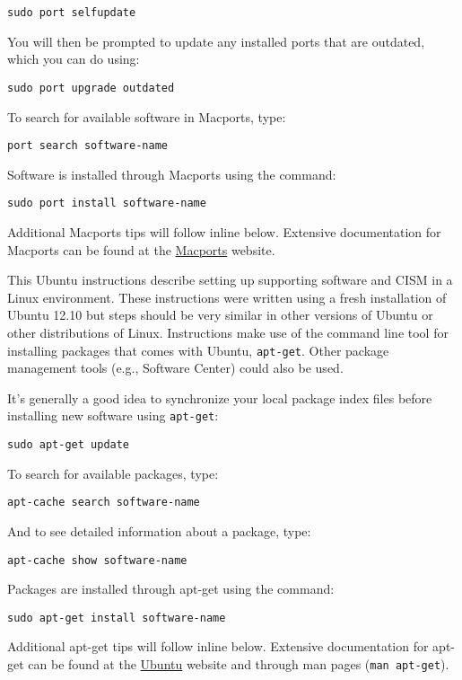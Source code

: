 \begin{mdframed}[style=mac]
\texttt{sudo port selfupdate}

You will then be prompted to update any installed ports that are outdated, which you can do using:

\texttt{sudo port upgrade outdated}

To search for available software in Macports, type: 

\texttt{port search software-name}

Software is installed through Macports using the command:

\texttt{sudo port install software-name}

Additional Macports tips will follow inline below. Extensive documentation for Macports 
can be found at the \href{http://guide.macports.org}{Macports} website.
\end{mdframed}              %


\begin{mdframed}[style=ubuntu] %
This Ubuntu instructions describe setting up supporting software and CISM in a Linux environment.
These instructions were written using a fresh installation of Ubuntu 12.10 but 
steps should be very similar in other versions of Ubuntu or other distributions of Linux.
Instructions make use of the command line tool for installing packages that comes with Ubuntu, 
\texttt{apt-get}.  Other package management tools (e.g., Software Center)
could also be used.

It's generally a good idea to synchronize your local package index files before
installing new software using \texttt{apt-get}:

\texttt{sudo apt-get update}

To search for available packages, type:

\texttt{apt-cache search software-name}

And to see detailed information about a package, type:

\texttt{apt-cache show software-name}

Packages are installed through apt-get using the command:

\texttt{sudo apt-get install software-name}

Additional apt-get tips will follow inline below. Extensive documentation for apt-get 
can be found at the \href{https://help.ubuntu.com/community/AptGet/Howto}{Ubuntu} website
and through man pages (\texttt{man apt-get}).
\end{mdframed}                 %



